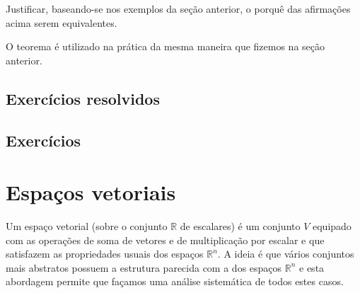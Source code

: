 \documentclass[../livro.tex]{subfiles}  %
\begin{document}
\begin{exercise}
	Justificar, baseando-se nos exemplos da seção anterior, o porquê das afirmações acima serem equivalentes.
\end{exercise}

O teorema é utilizado na prática da mesma maneira que fizemos na seção anterior.


\subsection*{Exercícios resolvidos}

\construirExeresol

\subsection*{Exercícios}

\construirExer


\section{Espaços vetoriais}


Um espaço vetorial (sobre o conjunto $\mathbb{R}$ de escalares) é um conjunto $V$ equipado com as operações de soma de vetores e de multiplicação por escalar e que satisfazem as propriedades usuais dos espaços $\mathbb{R}^n$. A ideia é que vários conjuntos mais abstratos possuem a estrutura parecida com a dos espaços $\mathbb{R}^n$ e esta abordagem permite que façamos uma análise sistemática de todos estes casos.
\end{document}
